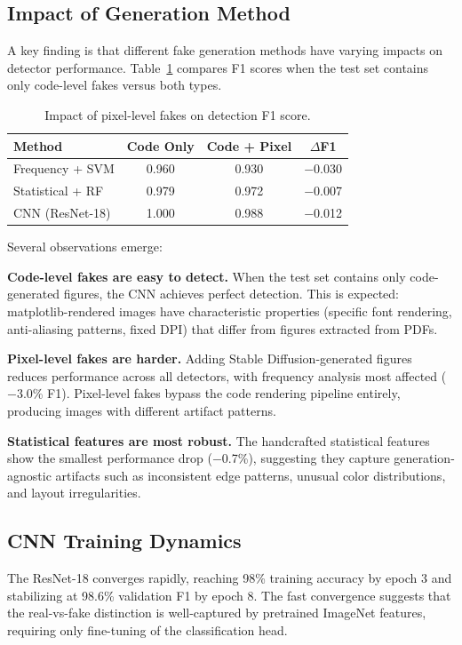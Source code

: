 \documentclass[11pt]{article}
\begin{document}
\subsection{Impact of Generation Method}

A key finding is that different fake generation methods have varying impacts on detector performance. Table~\ref{tab:impact} compares F1 scores when the test set contains only code-level fakes versus both types.

\begin{table}[h]
\centering
\caption{Impact of pixel-level fakes on detection F1 score.}
\label{tab:impact}
\begin{tabular}{lccc}
\toprule
\textbf{Method} & \textbf{Code Only} & \textbf{Code + Pixel} & \textbf{$\Delta$F1} \\
\midrule
Frequency + SVM & 0.960 & 0.930 & $-$0.030 \\
Statistical + RF & 0.979 & 0.972 & $-$0.007 \\
CNN (ResNet-18) & 1.000 & 0.988 & $-$0.012 \\
\bottomrule
\end{tabular}
\end{table}

Several observations emerge:

\textbf{Code-level fakes are easy to detect.} When the test set contains only code-generated figures, the CNN achieves perfect detection. This is expected: matplotlib-rendered images have characteristic properties (specific font rendering, anti-aliasing patterns, fixed DPI) that differ from figures extracted from PDFs.

\textbf{Pixel-level fakes are harder.} Adding Stable Diffusion-generated figures reduces performance across all detectors, with frequency analysis most affected ($-$3.0\% F1). Pixel-level fakes bypass the code rendering pipeline entirely, producing images with different artifact patterns.

\textbf{Statistical features are most robust.} The handcrafted statistical features show the smallest performance drop ($-$0.7\%), suggesting they capture generation-agnostic artifacts such as inconsistent edge patterns, unusual color distributions, and layout irregularities.

\subsection{CNN Training Dynamics}

The ResNet-18 converges rapidly, reaching 98\% training accuracy by epoch 3 and stabilizing at 98.6\% validation F1 by epoch 8. The fast convergence suggests that the real-vs-fake distinction is well-captured by pretrained ImageNet features, requiring only fine-tuning of the classification head.
\end{document}
